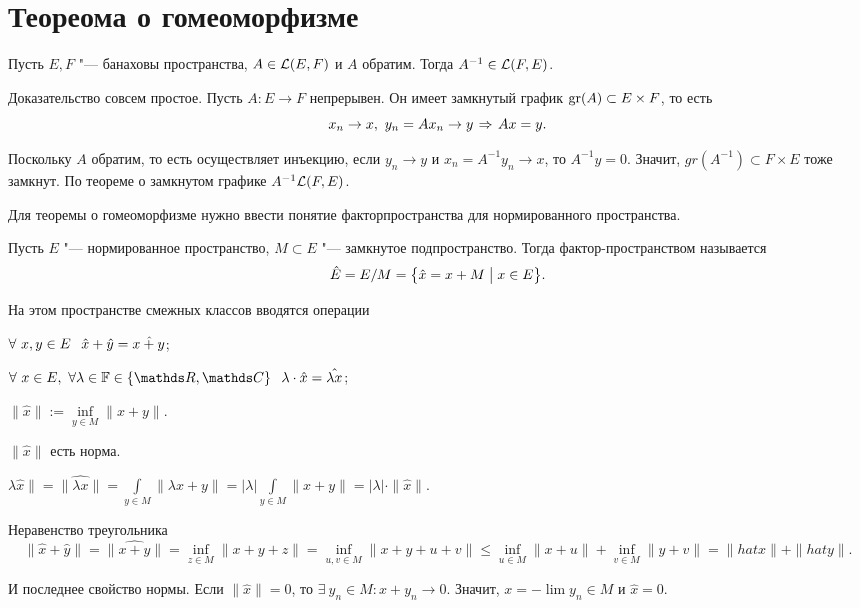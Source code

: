 \section{Теореома о гомеоморфизме}

\begin{The}
  Пусть $E,F$ "--- банаховы пространства, $A\in \mathcal L(E,F)$ и $A$ обратим. Тогда $A^{-1}\in\mathcal L(F,E)$.
\end{The}
\begin{Proof}
Доказательство совсем простое. Пусть $A\colon E\to F$ непрерывен. Он имеет замкнутый график $\operatorname{gr}(A)\subset E\times F$, то есть
\[
  x_n\to x,\ y_n = A x_n\to y\imp Ax=y.
\]

Поскольку $A$ обратим, то есть осуществляет инъекцию, если $y_n\to y$ и $x_n = A^{-1}y_n\to x$, то $A^{-1}y=0$. Значит, $gr(A^{-1})\subset F\times E$ тоже замкнут. По теореме о замкнутом графике $A^{-1}\mathcal L(F,E)$.
\end{Proof}

Для теоремы о гомеоморфизме нужно ввести понятие факторпространства для нормированного пространства.

\begin{Def}
Пусть $E$ "--- нормированное пространство, $M\subset E$ "--- замкнутое подпространство. Тогда фактор-пространством называется
\[
  \hat E = E/M = \big\{\hat x = x+ M\bigm|x\in E\big\}.
\]

На этом пространстве смежных классов вводятся операции
\begin{azItems}
\item $\forall\ x,y\in E\pau \hat x+ \hat y = \hat{x+y}$;
\item $\forall\ x\in E,\ \forall \lambda\in\F\in\{\R,\C\}\pau \lambda\cdot \hat x = \hat{\lambda x}$;
\item $\|\hat x\|:=\inf\limits_{y\in M}\|x+y\|$.
\end{azItems}
\end{Def}

\begin{Ut}
$\|\hat x\|$ есть норма.
\end{Ut}
\begin{Proof}
  $\lambda \hat x\| = \|\hat{\lambda x}\| =\int\limits_{y\in M}\|\lambda x+y\| = |\lambda|\int\limits_{y\in M}\|x+y\| = |\lambda|\cdot\|\hat x\|$.

Неравенство треугольника
\[
  \|\hat x+\hat y\| = \|\hat{x+y}\| = \inf\limits_{z\in M}\|x+y+z\| = \inf\limits_{u,v\in M}\|x+y+u+v\|\le
  \inf\limits_{u\in M}\|x+u\| + \inf\limits_{v\in M}\|y+v\| = \|hat x\| + \|hat y\|.
\]

И последнее свойство нормы. Если $\|\hat x\|=0$, то $\exists\ y_n\in M\colon x+y_n\to 0$. Значит, $x = -\lim y_n\in M$ и $\hat x=0$.
\end{Proof}


